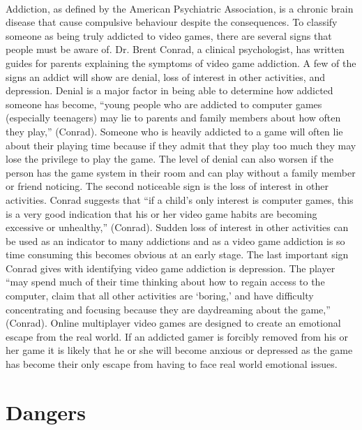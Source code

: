 \documentclass[a4paper,man,natbib]{apa6}
\begin{document}
\paragraph{}
	Addiction, as defined by the American Psychiatric Association, is a chronic brain disease that cause compulsive behaviour despite the consequences. To classify someone as being truly addicted to video games, there are several signs that people must be aware of. Dr. Brent Conrad, a clinical psychologist, has written guides for parents explaining the symptoms of video game addiction. A few of the signs an addict will show are denial, loss of interest in other activities, and depression. Denial is a major factor in being able to determine how addicted someone has become, “young people who are addicted to computer games (especially teenagers) may lie to parents and family members about how often they play,” (Conrad). Someone who is heavily addicted to a game will often lie about their playing time because if they admit that they play too much they may lose the privilege to play the game. The level of denial can also worsen if the person has the game system in their room and can play without a family member or friend noticing. The second noticeable sign is the loss of interest in other activities. Conrad suggests that “if a child’s only interest is computer games, this is a very good indication that his or her video game habits are becoming excessive or unhealthy,” (Conrad). Sudden loss of interest in other activities can be used as an indicator to many addictions and as a video game addiction is so time consuming this becomes obvious at an early stage. The last important sign Conrad gives with identifying video game addiction is depression. The player “may spend much of their time thinking about how to regain access to the computer, claim that all other activities are ‘boring,’ and have difficulty concentrating and focusing because they are daydreaming about the game,” (Conrad). Online multiplayer video games are designed to create an emotional escape from the real world. If an addicted gamer is forcibly removed from his or her game it is likely that he or she will become anxious or depressed as the game has become their only escape from having to face real world emotional issues.

\section{Dangers}
\end{document}
